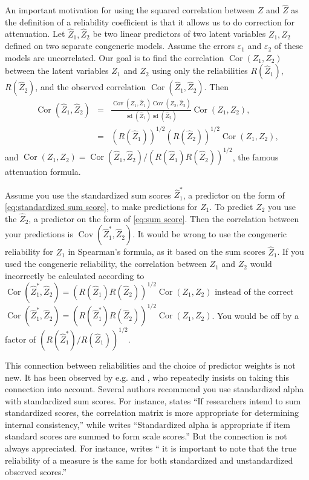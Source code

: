 \documentclass[twoside]{article}
\DeclareMathOperator{\sd}{sd}
\DeclareMathOperator{\Cor}{Cor}
\DeclareMathOperator{\Cov}{Cov}
\renewcommand{\sqrt}[1]{{(#1)^{1/2}}}
\begin{document}
An important motivation for using the squared
correlation between $Z$ and $\hat{Z}$ as the definition of a
reliability coefficient is that it allows us to do correction for
attenuation. Let $\hat{Z}_{1},\hat{Z}_{2}$ be two linear
predictors of two latent variables $Z_{1},Z_{2}$ defined on two separate
congeneric models. Assume the errors $\varepsilon_{1}$ and $\varepsilon_{2}$ of these models
are uncorrelated. Our goal is to find the correlation $\Cor(Z_{1},Z_{2})$
between the latent variables $Z_{1}$ and $Z_{2}$ using only the
reliabilities $ R(\hat{Z}_{1})$, $ R(\hat{Z}_{2})$,
and the observed correlation $\Cor(\hat{Z}_{1},\hat{Z}_{2})$.
Then
\begin{eqnarray*}
\Cor(\hat{Z}_{1},\hat{Z}_{2}) & = & \frac{\Cov(Z_{1},\hat{Z}_{1})\Cov(Z_{2},\hat{Z}_{2})}{\sd(\hat{Z}_{1})\sd(\hat{Z}_{2})}\Cor(Z_{1},Z_{2}),\\
 & = & \sqrt{ R(\hat{Z}_{1})}\sqrt{ R(\hat{Z}_{2})}\Cor(Z_{1},Z_{2}),
\end{eqnarray*}
and $\Cor(Z_{1},Z_{2})=\Cor(\hat{Z}_{1},\hat{Z}_{2})/\sqrt{ R(\hat{Z}_{1}) R(\hat{Z}_{2})}$,
the famous \citet{spearman1904proof} attenuation formula.


Assume you use the standardized sum scores $\hat{Z}_1^*$, a predictor on the form of  \cref{eq:standardized sum score}, to make predictions for $Z_1$. To predict $Z_2$ you use the $\hat{Z}_2$, a predictor on the form of \cref{eq:sum score}. Then the correlation between your predictions is $\Cov(\hat{Z}_1^*,\hat{Z}_2)$. It would be wrong to use the congeneric reliability for $Z_1$ in Spearman's formula, as it based on the sum scores $\hat{Z}_1$. If you used the congeneric reliability, the correlation between $Z_1$ and $Z_2$ would incorrectly be calculated according to $\Cor(\hat{Z}_{1}^*,\hat{Z}_{2})= \sqrt{ R(\hat{Z}_{1}) R(\hat{Z}_{2})}\Cor(Z_{1},Z_{2})$
instead of the correct $\Cor(\hat{Z}_{1}^*,\hat{Z}_{2})=\sqrt{ R(\hat{Z}_{1}^{*}) R(\hat{Z}_{2})}\Cor(Z_{1},Z_{2})$.
You would be off by a factor of $\sqrt{ R(\hat{Z}_{1}^{*})/ R(\hat{Z}_{1})}$.

This connection between reliabilities and the choice of predictor
weights is not new. It has been observed by e.g. \citet[][p. 112]{Joreskog1971-nn} and \citet{McNeish2018-vu}, who repeatedly insists on taking this connection into account. Several authors recommend you use standardized alpha with standardized sum scores. For instance, \citet[][p. 451]{Falk2011-ae} states \enquote{If researchers intend to sum
standardized scores, the correlation matrix is more appropriate for determining internal consistency,} while \citet[][p. 99]{Cortina1993-aq} writes \enquote{Standardized alpha is appropriate if item standard scores are summed to form scale scores.} But the connection is not always appreciated. For instance, \citet[][p.348]{Osburn2000-jd} writes
\enquote{\textelp{} it is important to note that the true reliability of a measure is the same for both standardized and unstandardized observed scores.}
\end{document}
